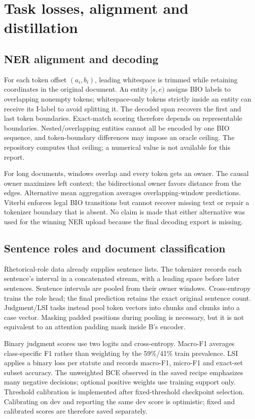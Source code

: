\section{Task losses, alignment and distillation}
\label{app:losses}
\subsection{NER alignment and decoding}
For each token offset $(a_i,b_i)$, leading whitespace is trimmed while retaining coordinates in the
original document. An entity $[s,e)$ assigns BIO labels to overlapping nonempty tokens; whitespace-only
tokens strictly inside an entity can receive its I-label to avoid splitting it. The decoded span recovers
the first and last token boundaries. Exact-match scoring therefore depends on representable boundaries.
Nested/overlapping entities cannot all be encoded by one BIO sequence, and token-boundary differences
may impose an oracle ceiling. The repository computes that ceiling; a numerical value is not available
for this report.

For long documents, windows overlap and every token gets an owner. The causal owner maximizes left
context; the bidirectional owner favors distance from the edges. Alternative mean aggregation averages
overlapping-window predictions. Viterbi enforces legal BIO transitions but cannot recover missing text
or repair a tokenizer boundary that is absent. No claim is made that either alternative was used for the
winning NER upload because the final decoding export is missing.

\subsection{Sentence roles and document classification}
Rhetorical-role data already supplies sentence lists. The tokenizer records each sentence's interval in
a concatenated stream, with a leading space before later sentences. Sentence intervals are pooled from
their owner windows. Cross-entropy trains the role head; the final prediction retains the exact original
sentence count. Judgment/LSI tasks instead pool token vectors into chunks and chunks into a case vector.
Masking padded positions during pooling is necessary, but it is not equivalent to an attention padding
mask inside B's encoder.

Binary judgment scores use two logits and cross-entropy. Macro-F1 averages class-specific F1 rather than
weighting by the 59\%/41\% train prevalence. LSI applies a binary loss per statute and records macro-F1,
micro-F1 and exact-set subset accuracy. The unweighted BCE observed in the saved recipe emphasizes
many negative decisions; optional positive weights use training support only. Threshold calibration is
implemented after fixed-threshold checkpoint selection. Calibrating on dev and reporting the same dev
score is optimistic; fixed and calibrated scores are therefore saved separately.

